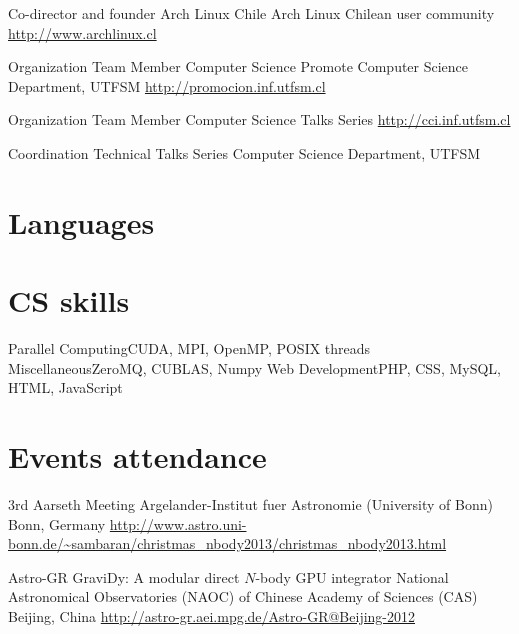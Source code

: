\documentclass[11pt,a4paper]{moderncv}
\begin{document}
        {Co-director and founder}
        {Arch Linux Chile}
        {Arch Linux Chilean user community}
        {\url{http://www.archlinux.cl}}
        {}

        {Organization Team Member}
        {Computer Science Promote}
        {Computer Science Department, UTFSM}
        {\url{http://promocion.inf.utfsm.cl}}
        {}

        {Organization Team Member}
        {Computer Science Talks Series}
        {\url{http://cci.inf.utfsm.cl}}
        {}{}

        {Coordination}
        {Technical Talks Series}
        {Computer Science Department, UTFSM}
        {}{}


\section{Languages}

\section{CS skills}
           {Parallel Computing}{CUDA, MPI, OpenMP, POSIX threads}
           {Miscellaneous}{ZeroMQ, CUBLAS, Numpy}
           {Web Development}{PHP, CSS, MySQL, HTML, JavaScript}

\section{Events attendance}
        {3rd Aarseth Meeting}
        {Argelander-Institut fuer Astronomie (University of Bonn)}
        {Bonn, Germany}
        {\url{http://www.astro.uni-bonn.de/~sambaran/christmas_nbody2013/christmas_nbody2013.html}}
        {}

        {Astro-GR}
        {GraviDy: A modular direct $N$-body GPU integrator}
        {National Astronomical Observatories (NAOC) of Chinese Academy of Sciences
        (CAS)}
        {Beijing, China}
        {\url{http://astro-gr.aei.mpg.de/Astro-GR@Beijing-2012}}
\end{document}
